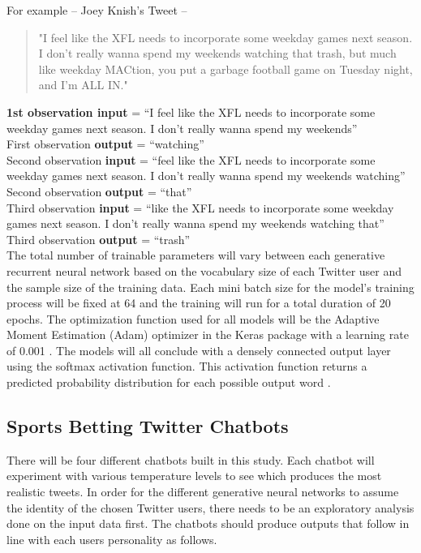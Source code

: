 \documentclass[5p,authoryear]{elsarticle}
\begin{document}
For example – Joey Knish’s Tweet – 

\begin{quote}
    "I feel like the XFL needs to incorporate some weekday games next season. I don’t really wanna spend my weekends watching that trash, but much like weekday MACtion, you put a garbage football game on Tuesday night, and I’m ALL IN."
\end{quote}

\textbf{1st observation \textbf{input}} = “I feel like the XFL needs to incorporate some weekday games next season. I don’t really wanna spend my weekends”\\

First observation \textbf{output} = “watching” \\

Second observation \textbf{input} = “feel like the XFL needs to incorporate some weekday games next season. I don’t really wanna spend my weekends watching”\\

Second observation \textbf{output} = “that” \\

Third observation \textbf{input} = “like the XFL needs to incorporate some weekday games next season. I don’t really wanna spend my weekends watching that”\\

Third observation \textbf{output} = “trash” \\


The total number of trainable parameters will vary between each generative recurrent neural network based on the vocabulary size of each Twitter user and the sample size of the training data. Each mini batch size for the model’s training process will be fixed at 64 and the training will run for a total duration of 20 epochs. The optimization function used for all models will be the Adaptive Moment Estimation (Adam) optimizer in the Keras package with a learning rate of 0.001 \citep{adam}. The models will all conclude with a densely connected output layer using the softmax activation function. This activation function returns a predicted probability distribution for each possible output word \citep{lane}.


\subsection{Sports Betting Twitter Chatbots}\label{chat}

There will be four different chatbots built in this study. Each chatbot will experiment with various temperature levels to see which produces the most realistic tweets. In order for the different generative neural networks to assume the identity of the chosen Twitter users, there needs to be an exploratory analysis done on the input data first. The chatbots should produce outputs that follow in line with each users personality as follows. 
\end{document}
